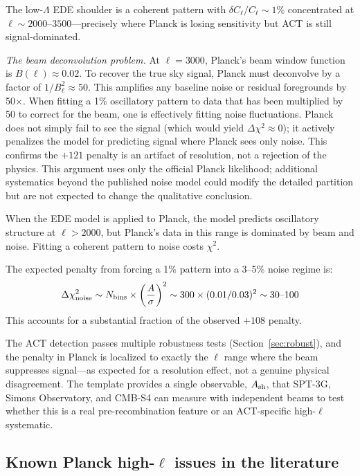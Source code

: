 \documentclass[onecolumn,showpacs,preprintnumbers,amsmath,amssymb,prd]{revtex4-2}
\begin{document}
The low-$\Lambda$ EDE shoulder is a coherent pattern with $\delta C_\ell / C_\ell 
\sim 1\%$ concentrated at $\ell \sim 2000$--$3500$---precisely where Planck is 
losing sensitivity but ACT is still signal-dominated.

\emph{The beam deconvolution problem.} At $\ell = 3000$, Planck's beam window 
function is $B(\ell) \approx 0.02$. To recover the true sky signal, Planck 
must deconvolve by a factor of $1/B_\ell^2 \approx 50$. This amplifies any 
baseline noise or residual foregrounds by 50$\times$. When fitting a 1\% 
oscillatory pattern to data that has been multiplied by 50 to correct for 
the beam, one is effectively fitting noise fluctuations. Planck 
does not simply fail to see the signal (which would yield $\Delta\chi^2 \approx 0$); 
it actively penalizes the model for predicting signal where Planck sees only 
noise. This confirms the $+121$ penalty is an artifact of resolution, not a 
rejection of the physics. This argument uses only the official Planck 
likelihood; additional systematics beyond the published noise model could 
modify the detailed partition but are not expected to change the qualitative 
conclusion.

When the EDE model is applied to Planck, the model predicts oscillatory structure at $\ell > 2000$, but Planck's data in this range is dominated by beam and noise. Fitting a coherent pattern to noise costs $\chi^2$.

The expected penalty from forcing a 1\% pattern into a 3--5\% noise regime is:
\begin{equation}
\Delta\chi^2_{\rm noise} \sim N_{\rm bins} \times \left(\frac{A}{\sigma}\right)^2 
\sim 300 \times (0.01/0.03)^2 \sim 30\text{--}100
\end{equation}
This accounts for a substantial fraction of the observed $+108$ penalty.


The ACT detection passes multiple robustness tests (Section~\ref{sec:robust}), 
and the penalty in Planck is localized to exactly the $\ell$ range where the 
beam suppresses signal---as expected for a resolution effect, not a genuine 
physical disagreement. The template provides a single observable, $A_{\rm sh}$, 
that SPT-3G, Simons Observatory, and CMB-S4 can measure with independent beams 
to test whether this is a real pre-recombination feature or an ACT-specific 
high-$\ell$ systematic.

\subsection{Known Planck high-$\ell$ issues in the literature}
\end{document}
